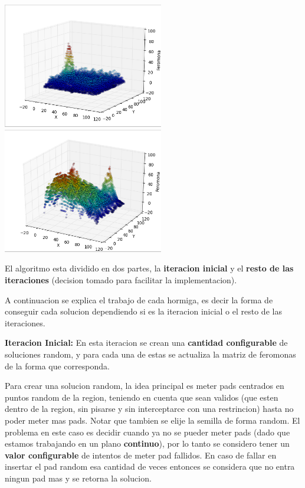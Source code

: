 \begin{center}

\includegraphics[width=7cm]{imagenes/fero0}
\includegraphics[width=7cm]{imagenes/fero1}
\end{center}


El algoritmo esta dividido en dos partes, la \textbf{iteracion inicial} y el \textbf{resto de las iteraciones} (decision tomado para facilitar la implementacion). 

A continuacion se explica el trabajo de cada hormiga, es decir la forma de conseguir cada solucion dependiendo si es la iteracion inicial o el resto de las iteraciones.

\textbf{Iteracion Inicial:} En esta iteracion se crean una \textbf{cantidad configurable} de soluciones random, y para cada una de estas se actualiza la matriz de feromonas de la forma que corresponda. 

Para crear una solucion random, la idea principal es meter pads centrados en puntos random de la region, teniendo en cuenta que sean validos (que esten dentro de la region, sin pisarse y sin interceptarce con una restrincion) hasta no poder meter mas pads. Notar que tambien se elije la semilla de forma random. El problema en este caso es decidir cuando ya no se pueder meter pads (dado que estamos trabajando en un plano \textbf{continuo}), por lo tanto se considero tener un \textbf{valor configurable} de intentos de meter pad fallidos. En caso de fallar en insertar el pad random esa cantidad de veces entonces se considera que no entra ningun pad mas y se retorna la solucion. 

